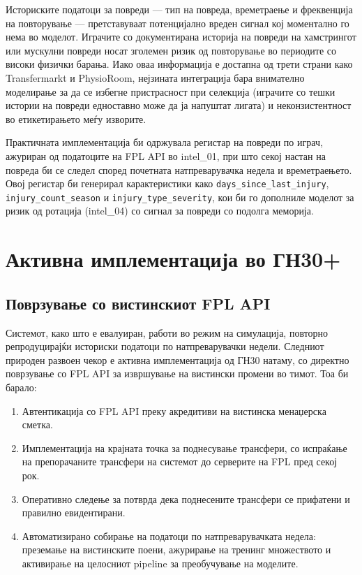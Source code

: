 Историските податоци за повреди — тип на повреда, времетраење и фреквенција на повторување — претставуваат потенцијално вреден сигнал кој моментално го нема во моделот. Играчите со документирана историја на повреди на хамстрингот или мускулни повреди носат зголемен ризик од повторување во периодите со високи физички барања. Иако оваа информација е достапна од трети страни како Transfermarkt и PhysioRoom, нејзината интеграција бара внимателно моделирање за да се избегне пристрасност при селекција (играчите со тешки истории на повреди едноставно може да ја напуштат лигата) и неконзистентност во етикетирањето меѓу изворите.

Практичната имплементација би одржувала регистар на повреди по играч, ажуриран од податоците на FPL API во intel\_01, при што секој настан на повреда би се следел според почетната натпреварувачка недела и времетраењето. Овој регистар би генерирал карактеристики како \texttt{days\_since\_last\_injury}, \texttt{injury\_count\_season} и \texttt{injury\_type\_severity}, кои би го дополниле моделот за ризик од ротација (intel\_04) со сигнал за повреди со подолга меморија.

\section{Активна имплементација во ГН30+}

\subsection{Поврзување со вистинскиот FPL API}

Системот, како што е евалуиран, работи во режим на симулација, повторно репродуцирајќи историски податоци по натпреварувачки недели. Следниот природен развоен чекор е активна имплементација од ГН30 натаму, со директно поврзување со FPL API за извршување на вистински промени во тимот. Тоа би барало:

\begin{enumerate}
  \item Автентикација со FPL API преку акредитиви на вистинска менаџерска сметка.
  \item Имплементација на крајната точка за поднесување трансфери, со испраќање на препорачаните трансфери на системот до серверите на FPL пред секој рок.
  \item Оперативно следење за потврда дека поднесените трансфери се прифатени и правилно евидентирани.
  \item Автоматизирано собирање на податоци по натпреварувачката недела: преземање на вистинските поени, ажурирање на тренинг множеството и активирање на целосниот pipeline за преобучување на моделите.
\end{enumerate}


